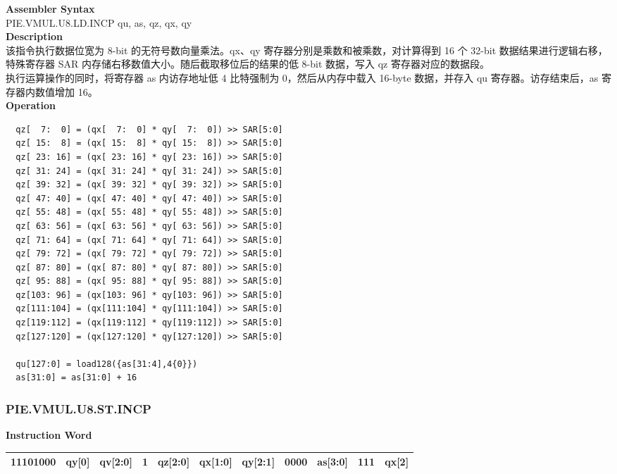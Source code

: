 \textbf{Assembler Syntax} \\
PIE.VMUL.U8.LD.INCP qu, as, qz, qx, qy \\
\textbf{Description} \\
该指令执行数据位宽为 8-bit 的无符号数向量乘法。qx、qy 寄存器分别是乘数和被乘数，对计算得到 16 个 32-bit 数据结果进行逻辑右移，特殊寄存器 SAR 内存储右移数值大小。随后截取移位后的结果的低 8-bit 数据，写入 qz 寄存器对应的数据段。\\ 执行运算操作的同时，将寄存器 as 内访存地址低 4 比特强制为 0，然后从内存中载入 16-byte 数据，并存入 qu 寄存器。访存结束后，as 寄存器内数值增加 16。\\
\textbf{Operation}
\begin{lstlisting}
  qz[  7:  0] = (qx[  7:  0] * qy[  7:  0]) >> SAR[5:0]
  qz[ 15:  8] = (qx[ 15:  8] * qy[ 15:  8]) >> SAR[5:0]
  qz[ 23: 16] = (qx[ 23: 16] * qy[ 23: 16]) >> SAR[5:0]
  qz[ 31: 24] = (qx[ 31: 24] * qy[ 31: 24]) >> SAR[5:0]
  qz[ 39: 32] = (qx[ 39: 32] * qy[ 39: 32]) >> SAR[5:0]
  qz[ 47: 40] = (qx[ 47: 40] * qy[ 47: 40]) >> SAR[5:0]
  qz[ 55: 48] = (qx[ 55: 48] * qy[ 55: 48]) >> SAR[5:0]
  qz[ 63: 56] = (qx[ 63: 56] * qy[ 63: 56]) >> SAR[5:0]
  qz[ 71: 64] = (qx[ 71: 64] * qy[ 71: 64]) >> SAR[5:0]
  qz[ 79: 72] = (qx[ 79: 72] * qy[ 79: 72]) >> SAR[5:0]
  qz[ 87: 80] = (qx[ 87: 80] * qy[ 87: 80]) >> SAR[5:0]
  qz[ 95: 88] = (qx[ 95: 88] * qy[ 95: 88]) >> SAR[5:0]
  qz[103: 96] = (qx[103: 96] * qy[103: 96]) >> SAR[5:0]
  qz[111:104] = (qx[111:104] * qy[111:104]) >> SAR[5:0]
  qz[119:112] = (qx[119:112] * qy[119:112]) >> SAR[5:0]
  qz[127:120] = (qx[127:120] * qy[127:120]) >> SAR[5:0]

  qu[127:0] = load128({as[31:4],4{0}})
  as[31:0] = as[31:0] + 16
\end{lstlisting}

\newpage
\subsubsection{PIE.VMUL.U8.ST.INCP}\label{instruction:PIEVMULU8STINCP}
\setlength\tabcolsep{6pt}
\textbf{Instruction Word} \\
\begin{tabular}{|c|c|c|c|c|c|c|c|c|c|c|}
	\hline
	11101000 & qy[0] & qv[2:0] & 1 & qz[2:0] & qx[1:0] & qy[2:1] & 0000 & as[3:0] & 111 & qx[2] \\
	\hline
\end{tabular}

